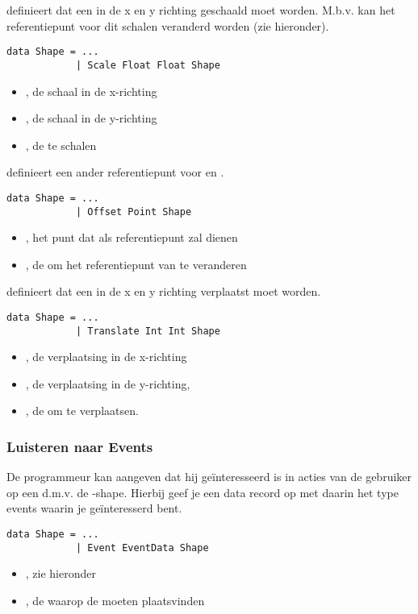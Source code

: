  definieert dat een \shape in de x en y richting geschaald moet worden. M.b.v.  kan het referentiepunt voor dit schalen veranderd worden (zie hieronder).
\begin{lstlisting}
data Shape = ...
			| Scale Float Float Shape
\end{lstlisting}
\begin{itemize}
	\item {}, de schaal in de x-richting
	\item {}, de schaal in de y-richting
	\item {}, de te schalen \shape
\end{itemize}

 definieert een ander referentiepunt voor  en .
\begin{lstlisting}
data Shape = ...
			| Offset Point Shape
\end{lstlisting}
\begin{itemize}
	\item {}, het punt dat als referentiepunt zal dienen
	\item {}, de \shape om het referentiepunt van te veranderen
\end{itemize}

 definieert dat een \shape in de x en y richting verplaatst moet worden.
\begin{lstlisting}
data Shape = ...
			| Translate Int Int Shape
\end{lstlisting}
\begin{itemize}
	\item {}, de verplaatsing in de x-richting
	\item {}, de verplaatsing in de y-richting,
	\item {}, de \shape om te verplaatsen. 
\end{itemize}

\subsubsection{Luisteren naar Events}
De programmeur kan aangeven dat hij geïnteresseerd is in acties van de gebruiker op een \shape d.m.v. de -shape. Hierbij geef je een data record op met daarin het type events waarin je geïnteresserd bent.

\begin{lstlisting}
data Shape = ...
			| Event EventData Shape
\end{lstlisting}
\begin{itemize}
	\item {}, zie hieronder
	\item {}, de \shape waarop de \events moeten plaatsvinden
\end{itemize}

